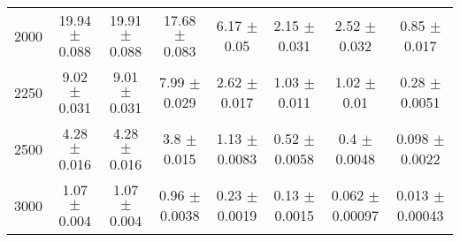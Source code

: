 \begin{footnotesize}
\begin{tabular}{c|c|c|c|c|c|c|c}
2000 & 19.94 $\pm$ 0.088 & 19.91 $\pm$ 0.088 & 17.68 $\pm$ 0.083 & 6.17 $\pm$ 0.05 & 2.15 $\pm$ 0.031 & 2.52 $\pm$ 0.032 & 0.85 $\pm$ 0.017\\ 
2250 & 9.02 $\pm$ 0.031 & 9.01 $\pm$ 0.031 & 7.99 $\pm$ 0.029 & 2.62 $\pm$ 0.017 & 1.03 $\pm$ 0.011 & 1.02 $\pm$ 0.01 & 0.28 $\pm$ 0.0051\\ 
2500 & 4.28 $\pm$ 0.016 & 4.28 $\pm$ 0.016 & 3.8 $\pm$ 0.015 & 1.13 $\pm$ 0.0083 & 0.52 $\pm$ 0.0058 & 0.4 $\pm$ 0.0048 & 0.098 $\pm$ 0.0022\\ 
3000 & 1.07 $\pm$ 0.004 & 1.07 $\pm$ 0.004 & 0.96 $\pm$ 0.0038 & 0.23 $\pm$ 0.0019 & 0.13 $\pm$ 0.0015 & 0.062 $\pm$ 0.00097 & 0.013 $\pm$ 0.00043\\ 
\hline\hline 
\end{tabular} 
\end{footnotesize} 
\newline 
